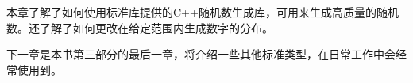 本章了解了如何使用标准库提供的C++随机数生成库，可用来生成高质量的随机数。还了解了如何更改在给定范围内生成数字的分布。

下一章是本书第三部分的最后一章，将介绍一些其他标准类型，在日常工作中会经常使用到。
